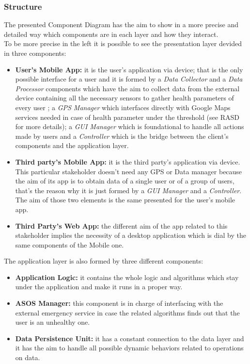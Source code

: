 \subsubsection{Structure}
The presented Component Diagram has the aim to show in a more precise and detailed way which components are in each layer and how they interact.\\
To be more precise in the left it is possible to see the presentation layer devided in three components:
\begin{itemize}
	\item \textbf {User's Mobile App:} it is the user's application via device; that is the only possible interface for a user and it is 			formed by a \textit {Data Collector} and a \textit {Data Processor} components which have the aim to collect data from the 			external device containing all the necessary sensors to gather health parameters of every user ; a \textit {GPS Manager} 			which interfaces directly with Google Maps services needed in case of health parameter under the threshold (see RASD for 			more details); a \textit {GUI Manager} which is foundational to handle all actions made by users and a \textit {Controller} 			which is the bridge between the client's components and the application layer.
	\item \textbf {Third party's Mobile App:} it is the third party's application via device. This particular stakeholder doesn't need 			any GPS or Data manager because the aim of its app is to obtain data  of a single user or of a group of users, that's the 			reason why it is just formed by a \textit{ GUI Manager} and a \textit {Controller}. The aim of those two elements is the same 			presented for the user's mobile app.
	\item \textbf {Third Party's Web App:} the different aim of the app related to this stakeholder implies the necessity of a 			desktop application which is dial by the same components of the Mobile one.
\end{itemize}The application layer is also formed by three different components:
\begin{itemize}
	\item \textbf{Application Logic:} it contains the whole logic and algorithms which stay under the application and make it runs in 			a proper way.
	\item \textbf{ ASOS Manager:} this component is in charge of interfacing with the external emergency service in case the 			related algorithms finds out that the user is an unhealthy one.
	\item \textbf{Data Persistence Unit:} it has a constant connection to the data layer and it has the aim to handle all possible 			dynamic behaviors related to operations on data.
\end{itemize}
